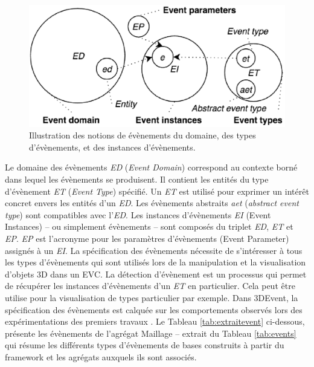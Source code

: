 \begin{figure}[ht]
	\centering
	\includegraphics[width=0.7\columnwidth]{eps/event4.eps}
	\caption{Illustration des notions de évènements du domaine, des types 
		d'évènements, et des instances d'évènements.}
	\label{fig:representation_event}
\end{figure}

Le domaine des évènements \textit{ED} (\textit{Event Domain}) correspond au 
contexte borné dans 
lequel les évènements se produisent. 
Il contient les entités du type d'évènement 
\textit{ET} (\textit{Event Type}) spécifié. Un \textit{ET} est utilisé pour exprimer un 
intérêt concret envers les entités d'un \textit{ED}. Les évènements abstraits 
\textit{aet} (\textit{abstract event type}) sont compatibles avec l'\textit{ED}. Les 
instances d'évènements \textit{EI} (Event Instances) -- ou simplement 
évènements -- sont composés du triplet \textit{ED}, \textit{ET} et \textit{EP}. 
\textit{EP} est l'acronyme pour les paramètres d'évènements (Event Parameter) 
assignés à un \textit{EI}. La spécification des évènements nécessite de 
s'intéresser à tous les types d'évènements qui sont utilisés lors de la manipulation 
et la visualisation d'objets 3D dans un \gls{EVC}. La détection d'évènement est un 
processus qui permet de récupérer les instances d'évènements d'un \textit{ET} en 
particulier. Cela peut être utilise pour la visualisation de types particulier par 
exemple. Dans 3DEvent, la spécification des évènements est calquée sur les 
comportements observés lors des expérimentations des premiers travaux 
\cite{Desprat2015a, Desprat2015b}. Le Tableau \ref{tab:extraitevent} ci-dessous, 
présente les évènements de l'agrégat Maillage -- extrait du Tableau 
\ref{tab:events} qui résume les 
différents types d'évènements de bases construits à partir du framework et les 
agrégats auxquels ils sont associés. 

